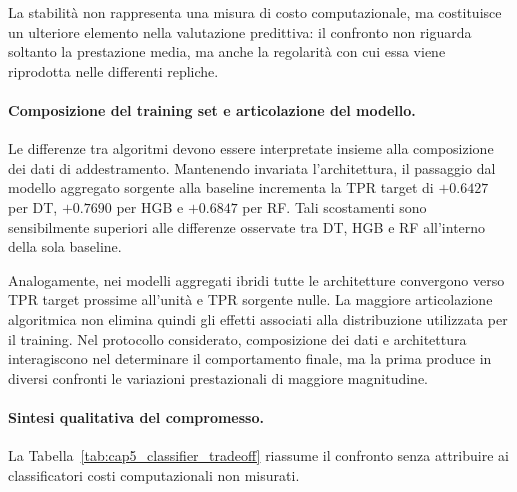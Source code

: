 La stabilità non rappresenta una misura di costo computazionale, ma costituisce un ulteriore elemento nella valutazione predittiva: il confronto non riguarda soltanto la prestazione media, ma anche la regolarità con cui essa viene riprodotta nelle differenti repliche.

\paragraph{Composizione del training set e articolazione del modello.}
Le differenze tra algoritmi devono essere interpretate insieme alla composizione dei dati di addestramento. 
Mantenendo invariata l'architettura, il passaggio dal modello aggregato sorgente alla baseline incrementa la TPR target di $+0.6427$ per DT, $+0.7690$ per HGB e $+0.6847$ per RF. 
Tali scostamenti sono sensibilmente superiori alle differenze osservate tra DT, HGB e RF all'interno della sola baseline.

Analogamente, nei modelli aggregati ibridi tutte le architetture convergono verso TPR target prossime all'unità e TPR sorgente nulle. 
La maggiore articolazione algoritmica non elimina quindi gli effetti associati alla distribuzione utilizzata per il training. 
Nel protocollo considerato, composizione dei dati e architettura interagiscono nel determinare il comportamento finale, ma la prima produce in diversi confronti le variazioni prestazionali di maggiore magnitudine.

\paragraph{Sintesi qualitativa del compromesso.}
La Tabella~\ref{tab:cap5_classifier_tradeoff} riassume il confronto senza attribuire ai classificatori costi computazionali non misurati.

